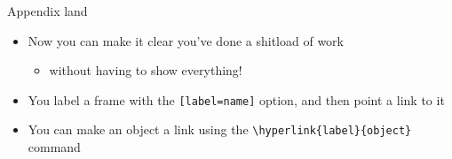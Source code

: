 \documentclass[12pt, aspectratio=169]{beamer}
\begin{document}
\appendix
\begin{frame}[label=appendix_end]{Appendix land}
  \begin{itemize}
    \item[] Now you can make it clear you've done a shitload of work
      \begin{itemize}
      \item[]  without having to show everything! \hyperlink{data_slide}{}
      \end{itemize}
    \item[] You label a frame with the \texttt{[label=name]} option, and then point a link to it
    \item[] You can make an object a link using the \texttt{\textbackslash hyperlink\{label\}\{object\}} command
  \end{itemize}
\end{frame}
\end{document}
